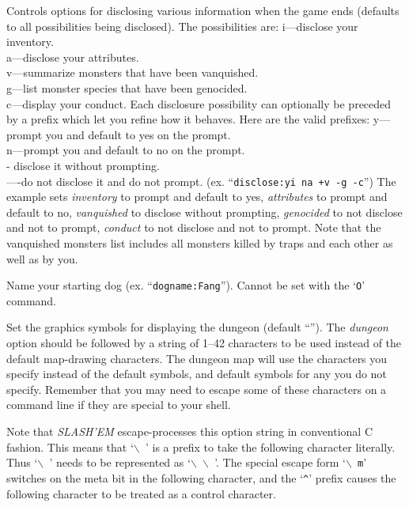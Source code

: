\item[\ib{disclose}]
Controls options for disclosing various information when the game ends (defaults
to all possibilities being disclosed).
The possibilities are:
i---disclose your inventory.\\
a---disclose your attributes.\\
v---summarize monsters that have been vanquished.\\
g---list monster species that have been genocided.\\
c---display your conduct.
Each disclosure possibility can optionally be preceded by a prefix which
let you refine how it behaves. Here are the valid prefixes:
y---prompt you and default to yes on the prompt.\\
n---prompt you and default to no on the prompt.\\
- disclose it without prompting.\\
----do not disclose it and do not prompt.
(ex. ``{\tt disclose:yi na +v -g -c}'')
The example sets 
{\it inventory\/} 
to prompt and default to yes,
{\it attributes\/} 
to prompt and default to no,
{\it vanquished\/} 
to disclose without prompting,
{\it genocided\/} 
to not disclose and not to prompt,
{\it conduct\/} 
to not disclose and not to prompt.
Note that the vanquished monsters list includes all monsters killed by
traps and each other as well as by you.

\item[\ib{dogname}]
Name your starting dog (ex. ``{\tt dogname:Fang}'').
Cannot be set with the `{\tt O}' command.

\item[\ib{dungeon}]
Set the graphics symbols for displaying the dungeon
(default \relax{}``'').
The
{\it dungeon\/} 
option should be followed by a string of 1--42
characters to be used instead of the default map-drawing characters.
The dungeon map will use the characters you specify instead of the
default symbols, and default symbols for any you do not specify.
Remember that you may need to escape some of these characters
on a command line if they are special to your shell.

Note that {\it SLASH'EM\/} escape-processes this option string in conventional C
fashion.  This means that `{\tt $\backslash$ }' is a prefix to take the following
character literally.  Thus `{\tt $\backslash$ }' needs to be represented as `{\tt $\backslash$ $\backslash$ }'.
The special escape
form `{\tt $\backslash$ m}' switches on the meta bit in the following character, and the `{\tt \^{}}'
prefix causes the following character to be treated as a control
character.

